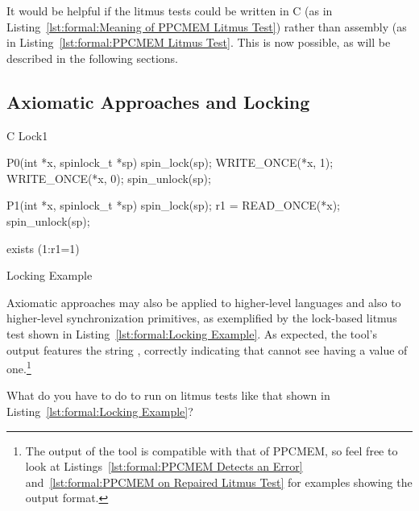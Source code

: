 It would be helpful if the litmus tests could be written in C
(as in Listing~\ref{lst:formal:Meaning of PPCMEM Litmus Test})
rather than assembly
(as in Listing~\ref{lst:formal:PPCMEM Litmus Test}.
This is now possible, as will be described in the following sections.

\subsection{Axiomatic Approaches and Locking}
\label{sec:formal:Axiomatic Approaches and Locking}

\begin{listing}[tb]
\begin{linelabel}
\begin{VerbatimL}[commandchars=\\\[\]]
C Lock1

{
}

P0(int *x, spinlock_t *sp)
{
	spin_lock(sp);
	WRITE_ONCE(*x, 1);
	WRITE_ONCE(*x, 0);
	spin_unlock(sp);
}

P1(int *x, spinlock_t *sp)
{
	spin_lock(sp);
	r1 = READ_ONCE(*x);
	spin_unlock(sp);
}

exists (1:r1=1)
\end{VerbatimL}
\end{linelabel}
\caption{Locking Example}
\label{lst:formal:Locking Example}
\end{listing}

Axiomatic approaches may also be applied to higher-level
languages and also to higher-level synchronization primitives, as
exemplified by the lock-based litmus test shown in
Listing~\ref{lst:formal:Locking Example}.
As expected, the  tool's output features the string ,
correctly indicating that  cannot see  having a value
of one.\footnote{
	The output of the  tool is compatible with that
	of PPCMEM, so feel free to look at
	Listings~\ref{lst:formal:PPCMEM Detects an Error}
	and~\ref{lst:formal:PPCMEM on Repaired Litmus Test}
	for examples showing the output format.}

\QuickQuiz{}
	What do you have to do to run  on litmus tests like
	that shown in Listing~\ref{lst:formal:Locking Example}?
 \QuickQuizEnd

